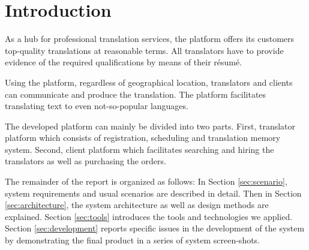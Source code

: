 \section{Introduction}
As a hub for professional translation services, the platform offers its customers top-quality translations at reasonable terms. All translators have to provide evidence of the required qualifications by means of their résumé.

Using the platform, regardless of geographical location, translators and clients can communicate and produce the translation. The platform facilitates translating text to even not-so-popular languages.

The developed platform can mainly be divided into two parts. First, translator platform which consists of registration,  scheduling and translation memory system. Second, client platform which facilitates searching and hiring the translators as well as purchasing the orders.

The remainder of the report is organized as follows: In Section \ref{sec:scenario}, system requirements and usual scenarios are described in detail. Then in Section \ref{sec:architecture}, the system architecture as well as design methods are explained. Section \ref{sec:tools} introduces the tools and technologies we applied. Section \ref{sec:development} reports specific issues in the development of the system by demonstrating the final product in a series of system screen-shots.